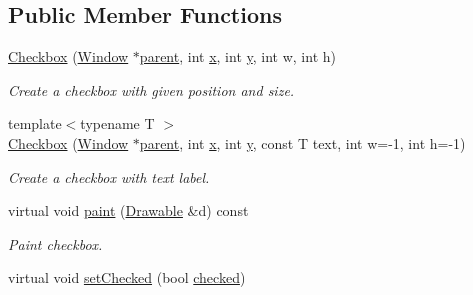 \subsection*{Public Member Functions}
\begin{DoxyCompactItemize}
\item 
\hypertarget{classGUI_1_1Checkbox_a025ab90d6def02c0df24d46999b16198}{\hyperlink{classGUI_1_1Checkbox_a025ab90d6def02c0df24d46999b16198}{Checkbox} (\hyperlink{classGUI_1_1Window}{Window} $\ast$\hyperlink{classGUI_1_1Window_a2e593ff65e7702178d82fe9010a0b539}{parent}, int \hyperlink{classGUI_1_1Window_a6ca6a80ca00c9e1d8ceea8d3d99a657d}{x}, int \hyperlink{classGUI_1_1Window_a0ee8e923aff2c3661fc2e17656d37adf}{y}, int w, int h)}\label{classGUI_1_1Checkbox_a025ab90d6def02c0df24d46999b16198}

\begin{DoxyCompactList}\small\item\em Create a checkbox with given position and size. \end{DoxyCompactList}\item 
{\footnotesize template$<$typename T $>$ }\\\hyperlink{classGUI_1_1Checkbox_accc7c898b46063c9b7e21d7563c17189}{Checkbox} (\hyperlink{classGUI_1_1Window}{Window} $\ast$\hyperlink{classGUI_1_1Window_a2e593ff65e7702178d82fe9010a0b539}{parent}, int \hyperlink{classGUI_1_1Window_a6ca6a80ca00c9e1d8ceea8d3d99a657d}{x}, int \hyperlink{classGUI_1_1Window_a0ee8e923aff2c3661fc2e17656d37adf}{y}, const T text, int w=-\/1, int h=-\/1)
\begin{DoxyCompactList}\small\item\em Create a checkbox with text label. \end{DoxyCompactList}\item 
\hypertarget{classGUI_1_1Checkbox_ad37c8e5dcccb0a4023585ef272f0ca90}{virtual void \hyperlink{classGUI_1_1Checkbox_ad37c8e5dcccb0a4023585ef272f0ca90}{paint} (\hyperlink{classGUI_1_1Drawable}{Drawable} \&d) const }\label{classGUI_1_1Checkbox_ad37c8e5dcccb0a4023585ef272f0ca90}

\begin{DoxyCompactList}\small\item\em Paint checkbox. \end{DoxyCompactList}\item 
\hypertarget{classGUI_1_1Checkbox_a75d3775dfe7d66fbb57070144ab823b4}{virtual void \hyperlink{classGUI_1_1Checkbox_a75d3775dfe7d66fbb57070144ab823b4}{set\-Checked} (bool \hyperlink{classGUI_1_1Checkbox_ab9e40eb561978770aad1095906c4fb65}{checked})}\label{classGUI_1_1Checkbox_a75d3775dfe7d66fbb57070144ab823b4}


\end{DoxyCompactItemize}
